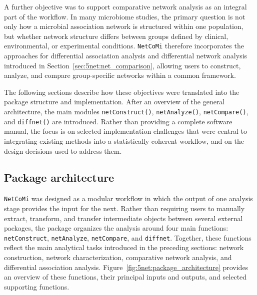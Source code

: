 A further objective was to support comparative network analysis as an integral part of the workflow. In many microbiome studies, the primary question is not only how a microbial association network is structured within one population, but whether network structure differs between groups defined by clinical, environmental, or experimental conditions. \texttt{NetCoMi} therefore incorporates the approaches for differential association analysis and differential network analysis introduced in Section~\ref{sec:5net:net_comparison}, allowing users to construct, analyze, and compare group-specific networks within a common framework.

The following sections describe how these objectives were translated into the package structure and implementation. After an overview of the general architecture, the main modules \texttt{netConstruct()}, \texttt{netAnalyze()}, \texttt{netCompare()}, and \texttt{diffnet()} are introduced. Rather than providing a complete software manual, the focus is on selected implementation challenges that were central to integrating existing methods into a statistically coherent workflow, and on the design decisions used to address them.

\subsection{Package architecture}
\label{sec:5net:workflow_implementation:architecture}


\texttt{NetCoMi} was designed as a modular workflow in which the output of one analysis stage provides the input for the next. Rather than requiring users to manually extract, transform, and transfer intermediate objects between several external packages, the package organizes the analysis around four main functions: \texttt{netConstruct}, \texttt{netAnalyze}, \texttt{netCompare}, and \texttt{diffnet}. Together, these functions reflect the main analytical tasks introduced in the preceding sections: network construction, network characterization, comparative network analysis, and differential association analysis. Figure~\ref{fig:5net:package_architecture} provides an overview of these functions, their principal inputs and outputs, and selected supporting functions.

